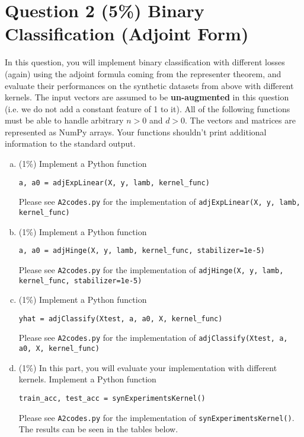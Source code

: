 \documentclass[12pt]{article}
\newcounter{ques}
\begin{document}
\section*{Question 2 (5\%) Binary Classification (Adjoint Form)}
In this question, you will implement binary classification with different losses (again) using the adjoint formula coming from the representer theorem, and evaluate their performances on the synthetic datasets from above with different kernels.
The input vectors are assumed to be \textbf{un-augmented} in this question (i.e. we do not add a constant feature of 1 to it). All of the following functions must be able to handle arbitrary $n > 0$ and $d > 0$. The vectors and matrices are represented as NumPy arrays. Your functions shouldn't print additional information to the
standard output.
\begin{enumerate}[(a)]
  \item (1\%) Implement a Python function
    \begin{center}
      \texttt{a, a0 = adjExpLinear(X, y, lamb, kernel\_func)}
    \end{center}
    Please see \texttt{A2codes.py} for the implementation of \texttt{adjExpLinear(X, y, lamb, kernel\_func)}
  \item (1\%) Implement a Python function
    \begin{center}
      \texttt{a, a0 = adjHinge(X, y, lamb, kernel\_func, stabilizer=1e-5)}
    \end{center}
    Please see \texttt{A2codes.py} for the implementation of \texttt{adjHinge(X, y, lamb, kernel\_func, stabilizer=1e-5)}
  \item (1\%) Implement a Python function
    \begin{center}
      \texttt{yhat = adjClassify(Xtest, a, a0, X, kernel\_func)}
    \end{center}
    Please see \texttt{A2codes.py} for the implementation of \texttt{adjClassify(Xtest, a, a0, X, kernel\_func)}
  \item (1\%) In this part, you will evaluate your implementation with different kernels. Implement a Python function
    \begin{center}
      \texttt{train\_acc, test\_acc = synExperimentsKernel()}
    \end{center}
    Please see \texttt{A2codes.py} for the implementation of \texttt{synExperimentsKernel()}. \\
    The results can be seen in the tables below.    
    \begin{table}[H]

\end{table}
\end{enumerate}
\end{document}
